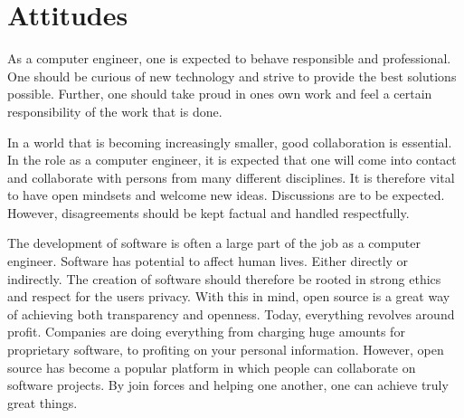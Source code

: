 \chapter{Attitudes}
As a computer engineer, one is expected to behave responsible and professional. One should be curious of new technology and strive to provide the best solutions possible. Further, one should take proud in ones own work and feel a certain responsibility of the work that is done. 

In a world that is becoming increasingly smaller, good collaboration is essential. In the role as a computer engineer, it is expected that one will come into contact and collaborate with persons from many different disciplines. It is therefore vital to have open mindsets and welcome new ideas. Discussions are to be expected. However, disagreements should be kept factual and handled respectfully.

The development of software is often a large part of the job as a computer engineer. Software has potential to affect human lives. Either directly or indirectly. The creation of software should therefore be rooted in strong ethics and respect for the users privacy. With this in mind, open source is a great way of achieving both transparency and openness. Today, everything revolves around profit. Companies are doing everything from charging huge amounts for proprietary software, to profiting on your personal information. However, open source has become a popular platform in which people can collaborate on software projects. By join forces and helping one another, one can achieve truly great things.